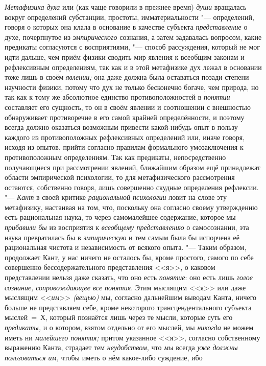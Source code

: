 {\em Метафизика духа} или (как чаще говорили в прежнее время)
{\em души} вращалась
вокруг определений субстанции, простоты, имматериальности
"--- определений, говоря о которых она клала в основание в
качестве субъекта {\em представление}
о духе, почерпнутое из {\em эмпирического}
сознания, а затем задавалась вопросом, какие предикаты
согласуются с восприятиями, "--- способ рассуждения, который не
мог идти дальше, чем приём физики сводить мир явления к всеобщим законам и
рефлексивным определениям, так как и в этой метафизике дух лежал в
основании тоже лишь в своём {\em явлении;} она даже
должна была оставаться позади степени научности физики,
потому что дух не только бесконечно богаче, чем природа, но
так как к тому же абсолютное единство противоположностей в
{\em понятии} составляет
его сущность, то он в своём явлении и соотношении с внешностью обнаруживает
противоречие в его самой крайней определённости, и поэтому всегда должно
оказаться возможным привести какой-нибудь опыт в пользу каждого из
противоположных рефлексивных определений или, иначе говоря, исходя из
опытов, прийти согласно правилам формального умозаключения к
противоположным определениям. Так как предикаты, непосредственно
получающиеся при рассмотрении явлений, ближайшим образом ещё принадлежат
области эмпирической психологии, то для метафизического рассмотрения
остаются, собственно говоря, лишь совершенно скудные определения
рефлексии. "--- {\em Кант} в
своей критике {\em рациональной
психологии} ловит на слове эту метафизику, настаивая на том,
что, поскольку она согласно своему утверждению есть рациональная наука, то
через самомалейшее содержание, которое мы
{\em прибавили бы} из
восприятия к {\em всеобщему
представлению} о самосознании, эта наука превратилась бы в
{\em эмпирическую} и тем
самым была бы испорчена её рациональная чистота и независимость от всякого
опыта. "--- Таким образом, продолжает Кант, у нас ничего не
осталось бы, кроме простого, самого по себе совершенно бессодержательного
представления <<я>>, о каковом представлении нельзя даже сказать, что оно
есть {\em понятие}: оно есть лишь {\em голое сознание,}
{\em сопровождающее все понятия}. Этим мыслящим <<я>> или даже мыслящим
<<{\em им}>> {\em (вещью)} мы, согласно
дальнейшим выводам Канта, ничего больше не представляем себе, кроме
некоторого трансцендентального субъекта мыслей~=~Х, который познаётся лишь
через те мысли, которые суть его {\em предикаты,} и о
котором, взятом отдельно от его мыслей, мы {\em никогда} не можем
иметь ни {\em малейшего понятия;}
притом указанное <<я>>, согласно собственному выражению Канта,
страдает тем {\em неудобством,} что {\em мы} всегда {\em уже должны
пользоваться им,} чтобы иметь о нём какое-либо суждение, ибо
